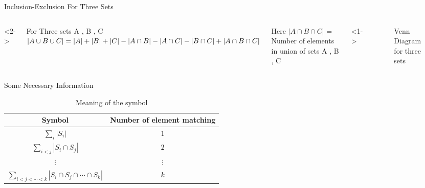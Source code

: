\documentclass[9pt]{beamer}
\begin{document}
\begin{frame}{Inclusion-Exclusion For Three Sets}

\begin{columns}
<2->
\begin{alertblock}{For Three sets A , B , C}
$|A\cup B\cup C|=|A|+|B|+|C|-\newline |A\cap B|-|A\cap C|-|B\cap C|+|A\cap B\cap C|$
\end{alertblock}
Here \textbf{$|A \cap B \cap C|$} = Number of elements in union of sets A , B , C

<1->
\begin{figure}

    \pause

    \caption{Venn Diagram for three sets}
    \label{fig:my_label}
\end{figure}


\end{columns}

\end{frame}

\begin{frame}{Some Necessary Information}
\begin{table}
    \centering
    \begin{tabular}{|c|c|}
    \hline
    \textbf{Symbol} & \textbf{Number of element matching}\\ \hline
    $\sum_i \left|S_i\right|$ &  $1$\\ \hline
    $\sum_{i < j} \left|S_i \cap S_j\right|$ & $2$\\ \hline
    $\vdots$ & $\vdots$ \\ \hline
    $\sum_{i < j < \cdots < k} \left|S_i \cap S_j \cap \cdots \cap S_k\right|$ & $k$ \\ \hline
     \end{tabular}
    \caption{Meaning of the symbol}
    \label{tab:my_label}
\end{table}


\end{frame}
\end{document}
